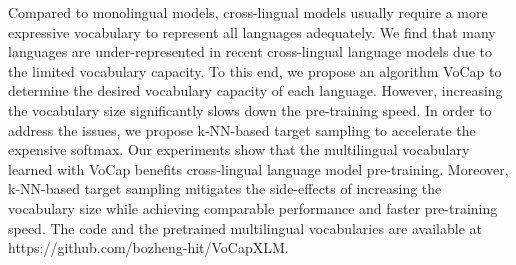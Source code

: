 Compared to monolingual models, cross-lingual models usually require a more expressive vocabulary to represent all languages adequately. We find that many languages are under-represented in recent cross-lingual language models due to the limited vocabulary capacity. To this end, we propose an algorithm VoCap to determine the desired vocabulary capacity of each language. However, increasing the vocabulary size significantly slows down the pre-training speed. In order to address the issues, we propose k-NN-based target sampling to accelerate the expensive softmax. Our experiments show that the multilingual vocabulary learned with VoCap benefits cross-lingual language model pre-training. Moreover, k-NN-based target sampling mitigates the side-effects of increasing the vocabulary size while achieving comparable performance and faster pre-training speed. The code and the pretrained multilingual vocabularies are available at https://github.com/bozheng-hit/VoCapXLM.
